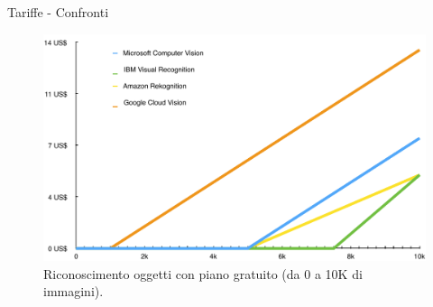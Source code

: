 %
\begin{frame}[t]{Tariffe - Confronti}
	\begin{figure}[h]
	\centering
	    \includegraphics[width=.6\paperwidth,keepaspectratio=true]{../../doc/img/grafico1}
		{\tiny \caption{Riconoscimento oggetti con piano gratuito (da 0 a 10K di immagini).}}
		\label{fig:tariffe-riconoscimento-oggetti-con-gratuito}
	\end{figure}
\end{frame}
%
